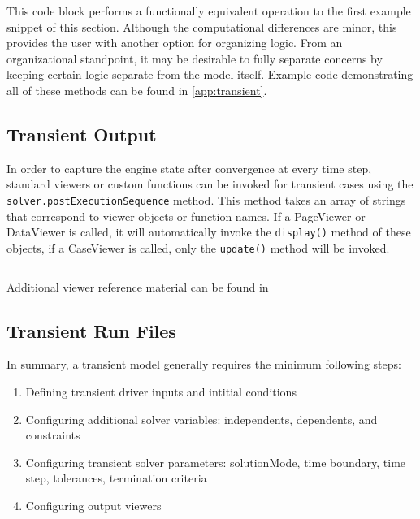 \documentclass[heading.tex]{subfiles}
\begin{document}
This code block performs a functionally equivalent operation to the first example snippet of this section.
Although the computational differences are minor, this provides the user with another option for organizing logic.
From an organizational standpoint,
it may be desirable to fully separate concerns by keeping certain logic separate from the model itself.
Example code demonstrating all of these methods can be found in \cref{app:transient}.

\subsection{Transient Output}

In order to capture the engine state after convergence at every time step, standard viewers or custom functions can be
invoked for transient cases using the \texttt{solver.postExecutionSequence} method. This method takes an array of strings that
correspond to viewer objects or function names. If a PageViewer or DataViewer is called, it will automatically invoke the
\texttt{display()} method of these objects, if a CaseViewer is called, only the \texttt{update()} method will be invoked.

 \begin{adjustwidth}{-1cm}{-1cm}
 \inputminted[]{c++}{code/transient1}
 \end{adjustwidth} 

Additional viewer reference material can be found in \cite[chap.~7.2.2, ~12, ~15.3.1]{NPSS}

\subsection{Transient Run Files}

In summary, a transient model generally requires the minimum following steps:

\begin{enumerate}
\item Defining transient driver inputs and intitial conditions
\item Configuring additional solver variables: independents, dependents, and constraints
\item Configuring transient solver parameters: solutionMode, time boundary, time step, tolerances, termination criteria
\item Configuring output viewers
\end{enumerate}
\end{document}
